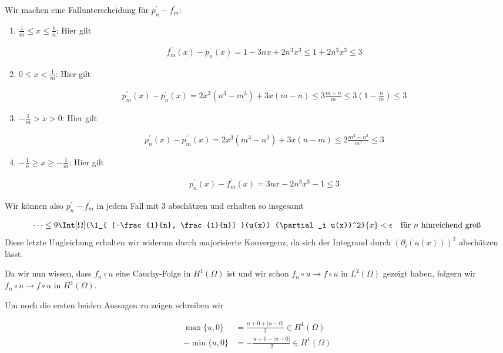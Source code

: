 \begin{solution}
Wir machen eine Fallunterscheidung für $p_n^\prime - f_m^\prime$:
\begin{enumerate}[label = \textbf{Fall \roman*:}]
  \item $\frac{1}{m} \leq x \leq \frac{1}{n}$: Hier gilt

    \begin{align*}
      f_m^\prime(x) - p_n^\prime(x)
      =
      1 - 3nx + 2n^3 x^3
      \leq
      1 + 2n^3 x^3
      \leq
      3
    \end{align*}

  \item $0 \leq x < \frac{1}{m}$: Hier gilt

    \begin{align*}
      p_m^\prime(x) - p_n^\prime(x)
      =
      2x^3(n^3-m^3) + 3x(m-n)
      \leq
      3 \frac{m-n}{m}
      \leq
      3 (1 - \frac{n}{m})
      \leq
      3
    \end{align*}

  \item $-\frac{1}{m} > x >0$: Hier gilt

    \begin{align*}
      p_n^\prime(x) - p_m^\prime(x)
      =
      2x^3(m^3-n^3) + 3x(n-m)
      \leq
      2 \frac{m^3-n^3}{m^3}
      \leq
      3
    \end{align*}

  \item $-\frac{1}{n} \geq x \geq -\frac{1}{m}$: Hier gilt

    \begin{align*}
      p_n^\prime(x) - f_m^\prime(x)
      =
      3nx - 2n^3x^3 - 1
      \leq
      3
    \end{align*}
\end{enumerate}

Wir können also $p_n^\prime - f_m^\prime$ in jedem Fall mit $3$ abschätzen und erhalten so insgesamt

\begin{align*}
  \cdots
  \leq
  9 \Int[\Omega]{\1_{
    [-\frac{1}{n}, \frac{1}{n}]
    }(u(x)) (\partial_i u(x))^2}{x}
    <
    \epsilon \quad \text{für}~ n ~\text{hinreichend groß}
\end{align*}
Diese letzte Ungleichung erhalten wir widerum durch majorisierte Konvergenz, da sich der
Integrand durch $(\partial_i(u(x)))^2$ abschätzen lässt.

Da wir nun wissen, dass $f_n \circ u$ eine Cauchy-Folge in $H^1(\Omega)$ ist und wir schon
$f_n \circ u \rightarrow f \circ u$ in $L^2(\Omega)$ gezeigt haben, folgern wir $f_n \circ u \rightarrow f \circ u$ in $H^1(\Omega)$.

Um noch die ersten beiden Aussagen zu zeigen schreiben wir

\begin{align*}
  \max\{u,0\}
  &=
  \frac{u + 0 + |u - 0|}{2} \in H^1(\Omega) \\
  -\min\{u, 0\}
  &=
  -\frac{u + 0 - |u - 0|}{2} \in H^1(\Omega)
\end{align*}
\end{solution}

